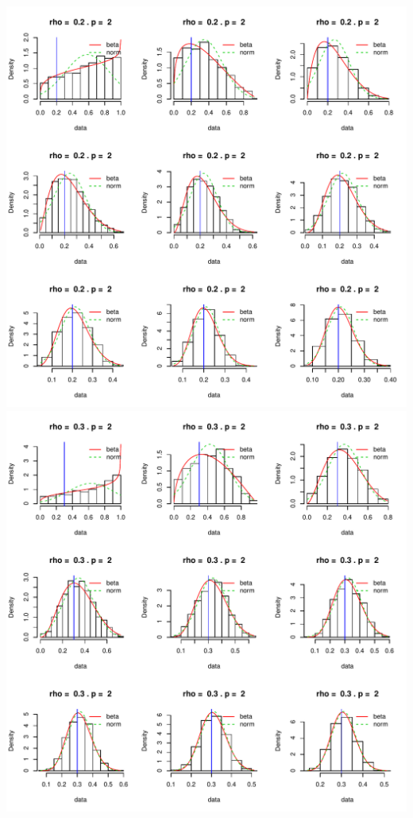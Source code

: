 \documentclass[]{article}
\begin{document}
\includegraphics{2016_w09_files/figure-latex/unnamed-chunk-14-3.pdf}
\includegraphics{2016_w09_files/figure-latex/unnamed-chunk-14-4.pdf}
\end{document}
